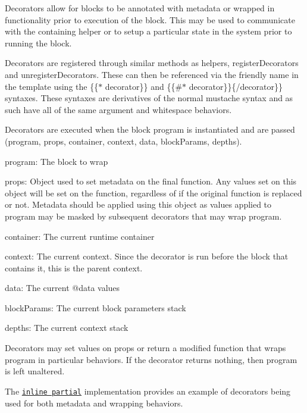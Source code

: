 Decorators allow for blocks to be annotated with metadata or wrapped in functionality prior to execution of the block. This may be used to communicate with the containing helper or to setup a particular state in the system prior to running the block.

Decorators are registered through similar methods as helpers, {\ttfamily register\+Decorators} and {\ttfamily unregister\+Decorators}. These can then be referenced via the friendly name in the template using the {\ttfamily \{\{$\ast$ decorator\}\}} and {\ttfamily \{\{\#$\ast$ decorator\}\}\{/decorator\}\}} syntaxes. These syntaxes are derivatives of the normal mustache syntax and as such have all of the same argument and whitespace behaviors.

Decorators are executed when the block program is instantiated and are passed {\ttfamily (program, props, container, context, data, block\+Params, depths)}.


\begin{DoxyItemize}
\item {\ttfamily program}\+: The block to wrap
\item {\ttfamily props}\+: Object used to set metadata on the final function. Any values set on this object will be set on the function, regardless of if the original function is replaced or not. Metadata should be applied using this object as values applied to {\ttfamily program} may be masked by subsequent decorators that may wrap {\ttfamily program}.
\item {\ttfamily container}\+: The current runtime container
\item {\ttfamily context}\+: The current context. Since the decorator is run before the block that contains it, this is the parent context.
\item {\ttfamily data}\+: The current {\ttfamily @data} values
\item {\ttfamily block\+Params}\+: The current block parameters stack
\item {\ttfamily depths}\+: The current context stack
\end{DoxyItemize}

Decorators may set values on {\ttfamily props} or return a modified function that wraps {\ttfamily program} in particular behaviors. If the decorator returns nothing, then {\ttfamily program} is left unaltered.

The \href{https://github.com/wycats/handlebars.js/blob/master/lib/handlebars/decorators/inline.js}{\tt inline partial} implementation provides an example of decorators being used for both metadata and wrapping behaviors. 